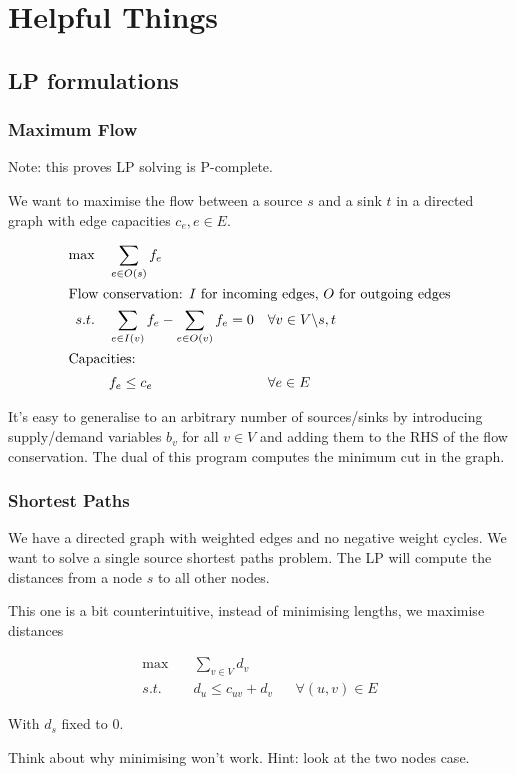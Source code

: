 \appendix
\chapter{Helpful Things}
\section{LP formulations}
\subsection{Maximum Flow}
Note: this proves LP solving is P-complete.

We want to maximise the flow between a source $s$ and a sink $t$ in a directed graph with edge capacities $c_e, e\in E$.

\begin{align*}
\max \quad & \sum_{e\in O(s)} f_e\\
\intertext{Flow conservation: $I$ for incoming edges, $O$ for outgoing edges}
s.t.\quad	& \sum_{e\in I(v)} f_e - \sum_{e\in O(v)} f_e = 0 && \forall v\in V\backslash {s,t}\\
\intertext{Capacities:}
	& f_e \leq c_e && \forall e \in E\\
\end{align*}

It's easy to generalise to an arbitrary number of sources/sinks by introducing supply/demand variables $b_v$ for all $v\in V$ and adding them to the RHS of the flow conservation. The dual of this program computes the minimum cut in the graph.

\subsection{Shortest Paths}

We have a directed graph with weighted edges and no negative weight cycles. We want to solve a single source shortest paths problem. The LP will compute the distances from a node $s$ to all other nodes.

This one is a bit counterintuitive, instead of minimising lengths, we maximise distances

\begin{align*}
\max \quad & \sum_{v\in V} d_v\\
s.t. \quad & d_u \leq c_{uv} + d_v && \forall (u,v) \in E
\end{align*}

With $d_s$ fixed to 0. 

Think about why minimising won't work. Hint: look at the two nodes case.

